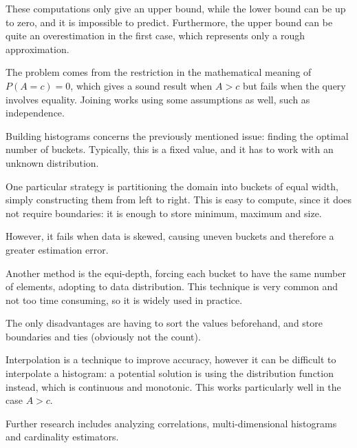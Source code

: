 These computations only give an upper bound, while the lower bound can be up to zero, and it is impossible to predict. Furthermore, the upper bound can be quite an overestimation in the first case, which represents only a rough approximation.

The problem comes from the restriction in the mathematical meaning of $P(A = c) = 0$, which gives a sound result when $A > c$ but fails when the query involves equality. Joining works using some assumptions as well, such as independence.

Building histograms concerns the previously mentioned issue: finding the optimal number of buckets. Typically, this is a fixed value, and it has to work with an unknown distribution.

One particular strategy is partitioning the domain into buckets of equal width, simply constructing them from left to right. This is easy to compute, since it does not require boundaries: it is enough to store minimum, maximum and size. 

However, it fails when data is skewed, causing uneven buckets and therefore a greater estimation error. 

Another method is the equi-depth, forcing each bucket to have the same number of elements, adopting to data distribution. This technique is very common and not too time consuming, so it is widely used in practice.

The only disadvantages are having to sort the values beforehand, and store boundaries and ties (obviously not the count).

Interpolation is a technique to improve accuracy, however it can be difficult to interpolate a histogram: a potential solution is using the distribution function instead, which is continuous and monotonic. This works particularly well in the case $A > c$.

Further research includes analyzing correlations, multi-dimensional histograms and cardinality estimators.